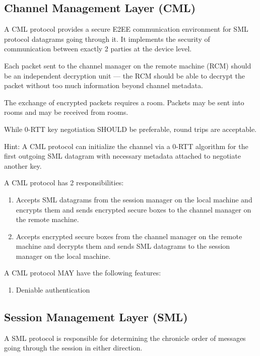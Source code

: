 \documentclass[a4paper,11pt]{article}
\begin{document}
\subsection{Channel Management Layer (CML)}

A CML protocol provides a secure E2EE communication environment for SML protocol datagrams going through it.
It implements the security of communication between exactly 2 parties at the device level.

Each packet sent to the channel manager on the remote machine (RCM) should be an independent decryption unit ---
the RCM should be able to decrypt the packet without too much information beyond channel metadata.

The exchange of encrypted packets requires a room.
Packets may be sent into rooms and may be received from rooms.

While 0-RTT key negotiation SHOULD be preferable, round trips are acceptable.

Hint: A CML protocol can initialize the channel via a 0-RTT algorithm for the first outgoing SML datagram
with necessary metadata attached to negotiate another key.

A CML protocol has 2 responsibilities:

\begin{enumerate}
	\item Accepts SML datagrams from the session manager on the local machine
	      and encrypts them and sends encrypted secure boxes to the channel manager on the remote machine.
	\item Accepts encrypted secure boxes from the channel manager on the remote machine
	      and decrypts them and sends SML datagrams to the session manager on the local machine.
\end{enumerate}

A CML protocol MAY have the following features:

\begin{enumerate}
    \item Deniable authentication
\end{enumerate}

\subsection{Session Management Layer (SML)}

A SML protocol is responsible for determining the chronicle order of messages going through the session in either direction.
\end{document}
